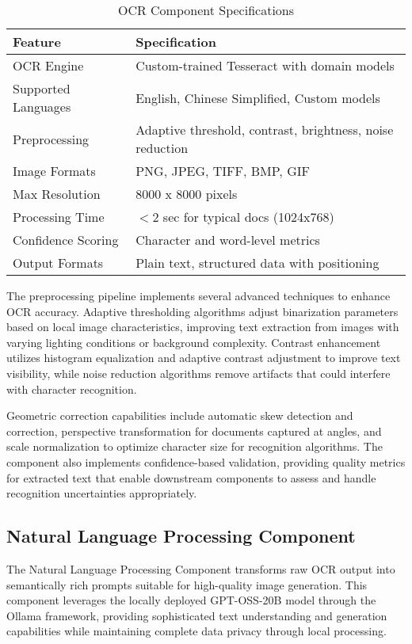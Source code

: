 \begin{table}[H]
\centering
\caption{OCR Component Specifications}
\label{tab:ocr_specifications}
{\begin{tabular}{ll}
\toprule
\textbf{Feature} & \textbf{Specification} \\
\midrule
OCR Engine & Custom-trained Tesseract with domain models \\
Supported Languages & English, Chinese Simplified, Custom models \\
Preprocessing & Adaptive threshold, contrast, brightness, noise reduction \\
Image Formats & PNG, JPEG, TIFF, BMP, GIF \\
Max Resolution & 8000 x 8000 pixels \\
Processing Time & $<$2 sec for typical docs (1024x768) \\
Confidence Scoring & Character and word-level metrics \\
Output Formats & Plain text, structured data with positioning \\
\bottomrule
\end{tabular}}
\end{table}

The preprocessing pipeline implements several advanced techniques to enhance OCR accuracy. Adaptive thresholding algorithms adjust binarization parameters based on local image characteristics, improving text extraction from images with varying lighting conditions or background complexity. Contrast enhancement utilizes histogram equalization and adaptive contrast adjustment to improve text visibility, while noise reduction algorithms remove artifacts that could interfere with character recognition.

Geometric correction capabilities include automatic skew detection and correction, perspective transformation for documents captured at angles, and scale normalization to optimize character size for recognition algorithms. The component also implements confidence-based validation, providing quality metrics for extracted text that enable downstream components to assess and handle recognition uncertainties appropriately.

\subsection{Natural Language Processing Component}

The Natural Language Processing Component transforms raw OCR output into semantically rich prompts suitable for high-quality image generation. This component leverages the locally deployed GPT-OSS-20B model through the Ollama framework, providing sophisticated text understanding and generation capabilities while maintaining complete data privacy through local processing.

